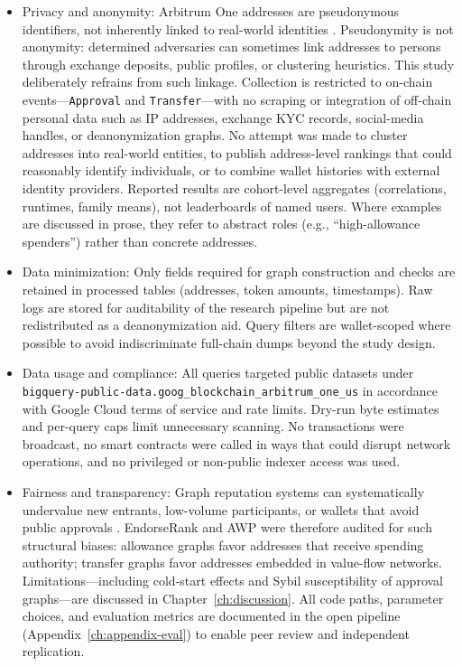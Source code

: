 \begin{itemize}
\item{}\label{sub:privacy-anonymity}
  Privacy and anonymity: Arbitrum One addresses are pseudonymous identifiers, not inherently linked to real-world identities . Pseudonymity is not anonymity: determined adversaries can sometimes link addresses to persons through exchange deposits, public profiles, or clustering heuristics. This study deliberately refrains from such linkage. Collection is restricted to on-chain events---\texttt{Approval} and \texttt{Transfer}---with no scraping or integration of off-chain personal data such as IP addresses, exchange KYC records, social-media handles, or deanonymization graphs. No attempt was made to cluster addresses into real-world entities, to publish address-level rankings that could reasonably identify individuals, or to combine wallet histories with external identity providers. Reported results are cohort-level aggregates (correlations, runtimes, family means), not leaderboards of named users. Where examples are discussed in prose, they refer to abstract roles (e.g., ``high-allowance spenders'') rather than concrete addresses.


\item{}\label{sub:data-minimization}
  Data minimization: Only fields required for graph construction and checks are retained in processed tables (addresses, token amounts, timestamps). Raw logs are stored for auditability of the research pipeline but are not redistributed as a deanonymization aid. Query filters are wallet-scoped where possible to avoid indiscriminate full-chain dumps beyond the study design.


\item{}\label{sub:data-usage-compliance}
  Data usage and compliance: All queries targeted public datasets under \texttt{bigquery-public-data.goog\_blockchain\_arbitrum\_one\_us} in accordance with Google Cloud terms of service and rate limits. Dry-run byte estimates and per-query caps limit unnecessary scanning. No transactions were broadcast, no smart contracts were called in ways that could disrupt network operations, and no privileged or non-public indexer access was used.


\item{}\label{sub:fairness-transparency}
  Fairness and transparency: Graph reputation systems can systematically undervalue new entrants, low-volume participants, or wallets that avoid public approvals . EndorseRank and AWP were therefore audited for such structural biases: allowance graphs favor addresses that receive spending authority; transfer graphs favor addresses embedded in value-flow networks. Limitations---including cold-start effects and Sybil susceptibility of approval graphs---are discussed in Chapter~\ref{ch:discussion}. All code paths, parameter choices, and evaluation metrics are documented in the open pipeline (Appendix~\ref{ch:appendix-eval}) to enable peer review and independent replication.



\end{itemize}
